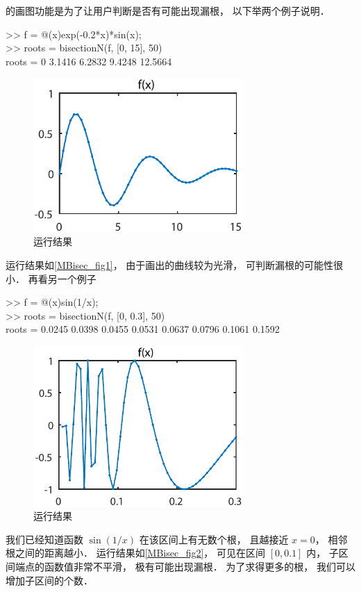  的画图功能是为了让用户判断是否有可能出现漏根， 以下举两个例子说明．
\begin{Command}
>> f = @(x)exp(-0.2*x)*sin(x); \\
>> roots = bisectionN(f, [0, 15], 50)\\
roots = 0    3.1416    6.2832    9.4248   12.5664
\end{Command}
\begin{figure}[ht]
\centering
\includegraphics[width=8cm]{./figures/MBisec.pdf}
\caption{运行结果} \label{MBisec_fig1}
\end{figure}
运行结果如\autoref{MBisec_fig1}， 由于画出的曲线较为光滑， 可判断漏根的可能性很小． 再看另一个例子
\begin{Command}
>> f = @(x)sin(1/x); \\
>> roots = bisectionN(f, [0, 0.3], 50)\\
roots = 0.0245    0.0398    0.0455    0.0531    0.0637    0.0796    0.1061    0.1592
\end{Command}
\begin{figure}[ht]
\centering
\includegraphics[width=8cm]{./figures/MBisec2.pdf}
\caption{运行结果} \label{MBisec_fig2}
\end{figure}
我们已经知道函数 $\sin(1/x)$ 在该区间上有无数个根， 且越接近 $x = 0$， 相邻根之间的距离越小． 运行结果如\autoref{MBisec_fig2}，  可见在区间 $[0, 0.1]$ 内， 子区间端点的函数值非常不平滑， 极有可能出现漏根． 为了求得更多的根， 我们可以增加子区间的个数．
